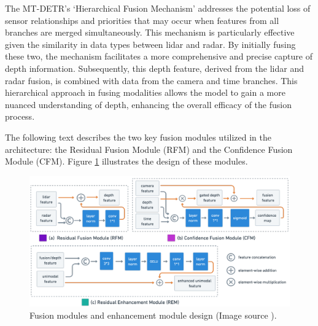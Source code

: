 \documentclass[report.tex]{subfiles}
\begin{document}
    The MT-DETR's `Hierarchical Fusion Mechanism' addresses the potential loss of sensor relationships and priorities that may occur when features from all branches are merged simultaneously. This mechanism is particularly effective given the similarity in data types between lidar and radar. By initially fusing these two, the mechanism facilitates a more comprehensive and precise capture of depth information. Subsequently, this depth feature, derived from the lidar and radar fusion, is combined with data from the camera and time branches. This hierarchical approach in fusing modalities allows the model to gain a more nuanced understanding of depth, enhancing the overall efficacy of the fusion process.


    The following text describes the two key fusion modules utilized in the architecture: the Residual Fusion Module (RFM) and the Confidence Fusion Module (CFM). Figure \ref{fig:mt_detr_fusion_modules} illustrates the design of these modules.

    \begin{figure}[h]
        \centering
        \includegraphics[width=1.0\textwidth]{images/methods/mtdetr/fusion_modules.png}
        \caption{Fusion modules and enhancement module design (Image source \cite{chu2023mt}).}
        \label{fig:mt_detr_fusion_modules}
    \end{figure}

\end{document}

